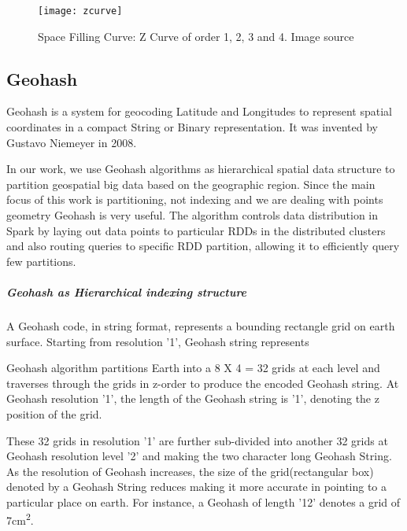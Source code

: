 \documentclass[article,type=msc,colorback,12pt,accentcolor=tud1d]{tudthesis}
\begin{document}
		  	\begin{figure}[h]
		  		\centering
		  		\texttt{[image: zcurve]}
		  		\caption{Space Filling Curve: Z Curve of order 1, 2, 3 and 4. Image source \cite{wiki:Zcurves_1, wiki:Zcurves} }
		  		\label{fig:zcurve}
		  	\end{figure}
		  
		  
		  \clearpage
		   \subsection{Geohash}
		   
		   Geohash is a system for geocoding Latitude and Longitudes to represent spatial coordinates in a compact String or Binary representation. It was invented by Gustavo Niemeyer in 2008. 		   \cite{wiki:geohash} \cite{Lee:2014:ESQ:2666310.2666481, 6691586} \cite{Balkic2012}
		   
		   In our work, we use  Geohash algorithms as hierarchical spatial data structure to partition geospatial big data based on the geographic region. Since the main focus of this work is partitioning, not indexing and we are dealing with points geometry Geohash is very useful. The algorithm controls data distribution in Spark by laying out data points to particular RDDs in the distributed clusters and also routing queries to specific RDD partition, allowing it to efficiently query few partitions.
		   
		   \subparagraph{Geohash as Hierarchical indexing structure}
		   
		   A Geohash code, in string format, represents a bounding rectangle grid on earth surface. Starting from resolution '1', Geohash string represents 
		   
		   Geohash algorithm partitions Earth into a 8 X 4 = 32 grids at each level and traverses through the grids in z-order \cite{wiki:Zcurves_1, wiki:Zcurves} to produce the encoded Geohash string. At Geohash resolution '1', the length of the Geohash string is '1', denoting the z position of the grid.
		   
		   These 32 grids in resolution '1' are further sub-divided into another 32 grids at Geohash resolution level '2' and making the two character long Geohash String. As the resolution of Geohash increases, the size of the grid(rectangular box) denoted by a Geohash String reduces making it more accurate in pointing to a particular place on earth. For instance, a Geohash of length '12' denotes a grid of 7cm\textsuperscript{2}.
			
\end{document}
